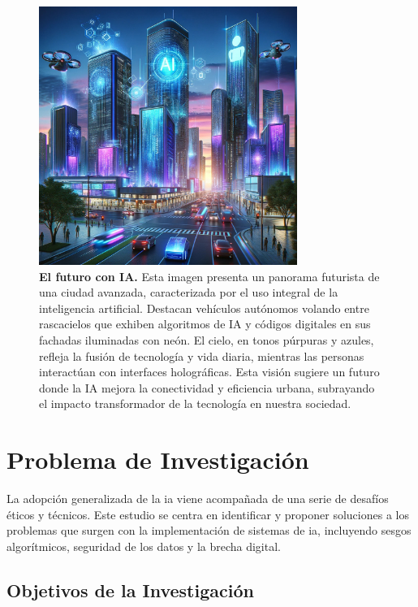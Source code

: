 \begin{figure}[ht!]
	\centering
	\includegraphics[width=0.75\textwidth]{chapters/1_introduction/figures/image_ia.jpg}
	\caption{\textbf{El futuro con IA.} Esta imagen presenta un panorama futurista de una ciudad avanzada, caracterizada por el uso integral de la inteligencia artificial. Destacan vehículos autónomos volando entre rascacielos que exhiben \glspl{algoritmo} de IA y códigos digitales en sus fachadas iluminadas con neón. El cielo, en tonos púrpuras y azules, refleja la fusión de tecnología y vida diaria, mientras las personas interactúan con interfaces holográficas. Esta visión sugiere un futuro donde la IA mejora la conectividad y eficiencia urbana, subrayando el impacto transformador de la tecnología en nuestra sociedad.}
	\label{fig:ai-future}
\end{figure}

\section{Problema de Investigación}

La adopción generalizada de la \acrshort{ia} viene acompañada de una serie de desafíos éticos y técnicos. Este estudio se centra en identificar y proponer soluciones a los problemas que surgen con la implementación de sistemas de \acrshort{ia}, incluyendo sesgos algorítmicos, seguridad de los datos y la brecha digital.

\subsection{Objetivos de la Investigación}

